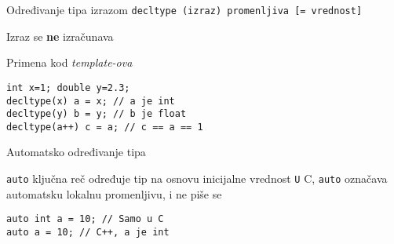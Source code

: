 \documentclass{article}
\newenvironment{xitemize}{%
    
    \itemize
    \larger
}{%
    \enditemize
}
\let\olditemize\itemize
\let\endolditemize\enditemize
\renewenvironment{itemize}{%
    \smaller
    \olditemize
}{%
    \endolditemize
}
\providecommand{\inlinecode}[1]{\texttt{#1}}
\begin{document}
\begin{xitemize}
\begin{multicols}{2}
\item Određivanje tipa izrazom\newline
\inlinecode{decltype (izraz) promenljiva [= vrednost]}
\begin{itemize}
    \item Izraz se \textbf{ne} izračunava
    \item Primena kod \textit{template-ova}
\end{itemize}
\columnbreak
\begin{lstlisting}
int x=1; double y=2.3;
decltype(x) a = x; // a je int
decltype(y) b = y; // b je float
decltype(a++) c = a; // c == a == 1
\end{lstlisting}
\end{multicols}
\item Automatsko određivanje tipa
\begin{itemize}
    \item \inlinecode{auto} ključna reč određuje tip na osnovu inicijalne vrednost 
    \inlinecode U C, \inlinecode{auto} označava automatsku lokalnu promenljivu, i ne piše se
    
    \begin{lstlisting}
auto int a = 10; // Samo u C
auto a = 10; // C++, a je int
\end{lstlisting}
\end{itemize}


\end{xitemize}
\end{document}

